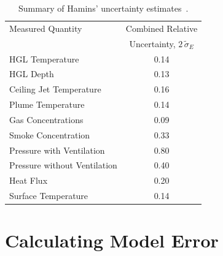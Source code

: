 \begin{table}[t]
\caption{Summary of Hamins' uncertainty estimates~\cite{NUREG_1824}. }
\begin{center}
\begin{tabular}{|l|c|}
\hline
Measured Quantity               & Combined Relative       \\
                                & Uncertainty, $2 \, \widetilde{\sigma}_E$       \\ \hline \hline
HGL Temperature                 & 0.14    \\ \hline
HGL Depth                       & 0.13    \\ \hline
Ceiling Jet Temperature         & 0.16    \\ \hline
Plume Temperature               & 0.14    \\ \hline
Gas Concentrations              & 0.09    \\ \hline
Smoke Concentration             & 0.33    \\ \hline
Pressure with Ventilation       & 0.80    \\ \hline
Pressure without Ventilation    & 0.40    \\ \hline
Heat Flux                       & 0.20    \\ \hline
Surface Temperature             & 0.14    \\ \hline
\end{tabular}
\end{center}
\label{Uncertainty}
\end{table}


\section{Calculating Model Error}

